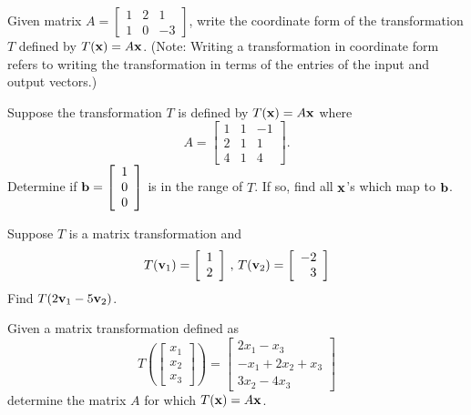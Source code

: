 \label{sec:mtx_trans_exer}

\be 
\item Given matrix $A=\left[ \begin{array}{ccr} 1& 2 & 1 \\ 1 & 0 & -3 \end{array} \right]$, write the coordinate form of the transformation $T$ defined by $T(\mathbf{x})=A\mathbf{x}$. (Note: Writing a transformation in coordinate form refers to writing the transformation in terms of the entries of the input and output vectors.)

\item Suppose the transformation $T$ is defined by $T(\mathbf{x})=A\mathbf{x}$ where 
\[A=\left[ \begin{array}{ccr} 1&1&-1 \\ 2&1&1 \\ 4&1&4 \end{array} \right].\] Determine if $\mathbf{b}=\left[ \begin{array}{c} 1\\0\\0 \end{array} \right]$ is in the range of $T$. If so, find all $\mathbf{x}$'s which map to $\mathbf{b}$.

\item Suppose $T$ is a matrix transformation and 
\[ T(\mathbf{v}_1) = \left[ \begin{array}{c} 1 \\ 2 \end{array} \right] \, , \, T(\mathbf{v}_2) = \left[ \begin{array}{r} -2 \\ 3 \end{array} \right] \]
Find $T(2\mathbf{v}_1 -5 \mathbf{v}_2)$.

\item Given a matrix transformation defined as 
\[ T\left( \left[ \begin{array}{c} x_1 \\ x_2 \\ x_3 \end{array} \right] \right) = \left[ \begin{array}{c} 2x_1 -x_3 \\ -x_1 +2x_2 +x_3 \\ 3x_2 - 4x_3 \end{array} \right] \]
determine the matrix $A$ for which $T(\mathbf{x}) = A\mathbf{x}$.

